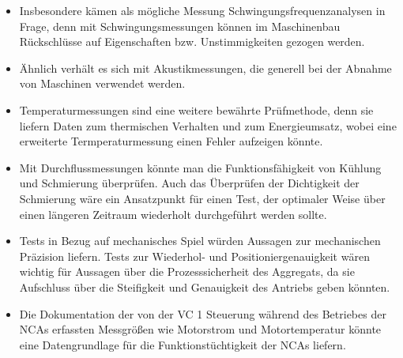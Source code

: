 \begin{itemize}
 \item  Insbesondere kämen als mögliche Messung Schwingungsfrequenzanalysen in Frage, denn mit Schwingungsmessungen können im Maschinenbau Rückschlüsse auf Eigenschaften bzw. Unstimmigkeiten gezogen werden.
 
 \item Ähnlich verhält es sich mit Akustikmessungen, die generell bei der Abnahme von Maschinen verwendet werden. 
 
 \item Temperaturmessungen sind eine weitere bewährte Prüfmethode, denn sie liefern Daten zum thermischen Verhalten und zum Energieumsatz, wobei eine erweiterte Termperaturmessung einen Fehler aufzeigen könnte. 
 
 
 \item Mit Durchflussmessungen könnte man die Funktionsfähigkeit von Kühlung und Schmierung überprüfen. Auch das Überprüfen der Dichtigkeit der Schmierung wäre ein Ansatzpunkt für einen Test, der optimaler Weise über einen längeren Zeitraum wiederholt durchgeführt werden sollte.
 
 \item Tests in Bezug auf mechanisches Spiel würden Aussagen zur mechanischen Präzision liefern. Tests zur Wiederhol- und Positioniergenauigkeit wären wichtig für Aussagen über die Prozesssicherheit des Aggregats, da sie Aufschluss über die Steifigkeit und Genauigkeit des Antriebs geben könnten.


 \item Die Dokumentation der von der VC 1 Steuerung während des Betriebes der NCAs erfassten Messgrößen wie Motorstrom und Motortemperatur könnte eine Datengrundlage für die Funktionstüchtigkeit der NCAs liefern.
\end{itemize}


















